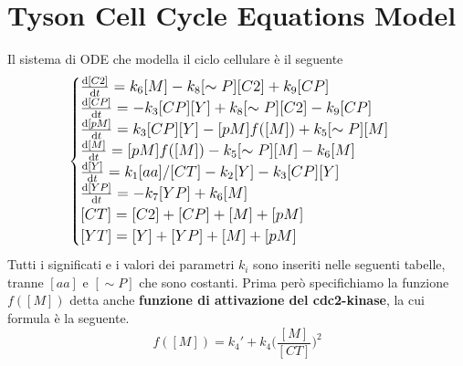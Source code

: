 \documentclass[11pt]{article}
\newcommand{\der}[1]{\frac{\mathrm{d}#1}{\mathrm{d}t}}
\begin{document}
\section{Tyson Cell Cycle Equations Model}
Il sistema di ODE che modella il ciclo cellulare è il seguente
\begin{equation}
    {\large
        \begin{cases}
            \der{[C2]} = k_6[M] - k_8[\sim P][C2] + k_9[CP]\\
            \der{[CP]} = -k_3[CP][Y] + k_8[\sim P][C2] - k_9[CP]\\
            \der{[pM]} = k_3[CP][Y] - [pM]f([M]) + k_5[\sim P][M]\\
            \der{[M]}  = [pM]f([M]) - k_5[\sim P][M] - k_6[M]\\
            \der{[Y]}  = k_1[aa]/[CT] - k_2[Y] - k_3[CP][Y]\\
            \der{[YP]} = -k_7[YP] + k_6[M]\\
            [CT]       = [C2] + [CP] + [M] + [pM]\\
            [YT]       = [Y]  + [YP] + [M] + [pM]
        \end{cases}
    }
\end{equation}
Tutti i significati e i valori dei parametri $k_i$ sono inseriti nelle seguenti tabelle, tranne $[aa]$ e $[\sim P]$ che sono costanti. Prima però specifichiamo la funzione $f([M])$ detta anche \textbf{funzione di attivazione del cdc2-kinase}, la cui formula è la seguente.
\begin{equation}
    f([M]) = k_4' + k_4\Biggl(\frac{[M]}{[CT]}\Biggr)^2
\end{equation}
\end{document}
